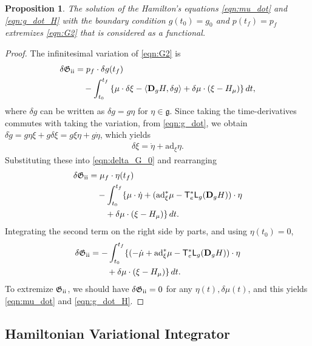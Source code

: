\documentclass[letterpaper, 10pt, conference]{ieeeconf}
\newcommand{\braces}[1]{\ensuremath{\left\{ #1 \right\}}}
\newcommand{\parenth}[1]{\ensuremath{\left( #1 \right)}}
\newcommand{\T}{\ensuremath{\mathsf{T}}}
\renewcommand{\L}{\ensuremath{\mathsf{L}}}
\newcommand{\D}{\ensuremath{\mathbf{D}}}
\newcommand{\pair}[1]{\ensuremath{\left\langle #1 \right\rangle}}
\newcommand{\ad}{\ensuremath{\mathrm{ad}}}
\newcommand{\g}{\ensuremath{\mathfrak{g}}}
\newcommand{\RomanNumeralCaps}[1]{\textup{\uppercase\expandafter{\romannumeral#1}}}
\newcommand{\RII}{\RomanNumeralCaps{2}}
\newtheorem{prop}{Proposition}
\begin{document}
\begin{prop}\label{prop:PVPII}
    The solution of the Hamilton's equations \eqref{eqn:mu_dot} and \eqref{eqn:g_dot_H} with the boundary condition $g(t_0)=g_0$ and $p(t_f)=p_f$ extremizes \eqref{eqn:G2} that is considered as a functional.
\end{prop}
\begin{proof}
    The infinitesimal variation of \eqref{eqn:G2} is
\begin{align}
    \delta\mathfrak{G}_\RII & = p_f \cdot \delta g(t_f)\nonumber\\
                            & \quad - \int_{t_0}^{t_f} \braces{ \mu \cdot \delta\xi - \pair{\D_g H, \delta g} +\delta\mu \cdot \parenth{ \xi - H_\mu}} dt,\label{eqn:delta_G_0}
\end{align}
where $\delta g$ can be written as $\delta g = g\eta$ for $\eta\in\g$.
Since taking the time-derivatives commutes with taking the variation, from \eqref{eqn:g_dot}, we obtain $\delta \dot g = g\eta\xi + g\delta \xi = g\xi \eta + g \dot\eta$, which yields 
\begin{align}
\delta \xi = \dot \eta + \ad_\xi\eta.
\end{align}
Substituting these into \eqref{eqn:delta_G_0} and rearranging
\begin{align*}
    \delta\mathfrak{G}_\RII & = \mu_f \cdot \eta(t_f)\\
                            & \quad - \int_{t_0}^{t_f} \{ \mu\cdot\dot\eta + (\ad^*_\xi\mu - \T^*_e \L_g (\D_g H))\cdot \eta \\
                            & \qquad + \delta\mu\cdot(\xi- H_\mu)\}\,dt.
\end{align*}
Integrating the second term on the right side by parts, and using $\eta(t_0)=0$, 
\begin{align*}
    \delta\mathfrak{G}_\RII & = 
     - \int_{t_0}^{t_f} \{  (-\dot \mu+\ad^*_\xi\mu - \T^*_e \L_g (\D_g H))\cdot \eta \\
                            & \qquad + \delta\mu\cdot(\xi- H_\mu)\}\,dt.
\end{align*}
To extremize $\mathfrak{G}_\RII$, we should have $\delta\mathfrak{G}_\RII=0$ for any $\eta(t),\delta\mu(t)$, and this yields \eqref{eqn:mu_dot} and \eqref{eqn:g_dot_H}.
\end{proof}

\subsection{Hamiltonian Variational Integrator}
\end{document}
